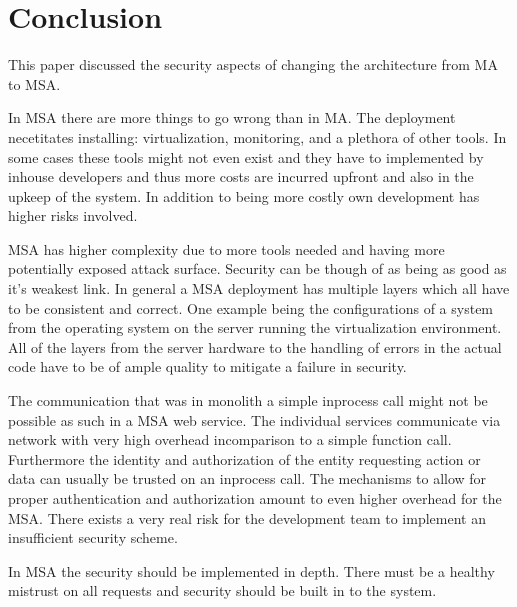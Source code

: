 \section{Conclusion}
\begin{sloppypar}
    This paper discussed the security aspects of changing the architecture from MA to MSA.
\end{sloppypar}
\begin{sloppypar}
    In MSA there are more things to go wrong than in MA. The deployment 
    necetitates installing: virtualization, monitoring, and a plethora of other
    tools. In some cases these tools might not even exist and they have to 
    implemented by inhouse developers and thus more costs are incurred upfront 
    and also in the upkeep of the system. In addition to being more costly own 
    development has higher risks involved.
\end{sloppypar}
\begin{sloppypar}
    MSA has higher complexity due to more tools needed and having more potentially 
    exposed attack surface. Security can be though of as being as good as it's 
    weakest link. In general a MSA deployment has multiple layers which all 
    have to be consistent and correct. One example being the configurations of 
    a system from the operating system on the server running the virtualization 
    environment. All of the layers from the server hardware to the handling of 
    errors in the actual code have to be of ample quality to mitigate a failure in 
    security.
\end{sloppypar}
\begin{sloppypar}
    The communication that was in monolith a simple inprocess call might not be 
    possible as such in a MSA web service. The individual services communicate 
    via network with very high overhead incomparison to a simple function call. 
    Furthermore the identity and authorization of the entity requesting action 
    or data can usually be trusted on an inprocess call. The mechanisms to 
    allow for proper authentication and authorization amount to even higher 
    overhead for the MSA. There exists a very real risk for the development 
    team to implement an insufficient security scheme.
\end{sloppypar}
\begin{sloppypar}
    In MSA the security should be implemented in depth. There must be a healthy 
    mistrust on all requests and security should be built in to the system.
\end{sloppypar}
